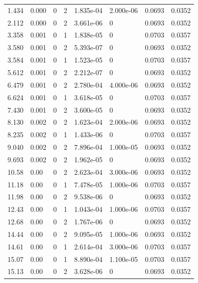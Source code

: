 \documentclass[preview]{standalone}
\begin{document}
{{\begin{tabular}{L{1.2cm}C{1.2cm} C{0.3cm}C{0.5cm} C{1.4cm}C{1.4cm} C{1.4cm}C{1.4cm}}
  1.434  &  0.000  & 0     &  2 &  1.835e-04  & 2.000e-06  & 0.0693 &  0.0352   \\ 
  2.112  &  0.000  & 0     &  2 &  3.661e-06  & 0  & 0.0693 &  0.0352   \\ 
  3.358  &  0.001  & 0     &  1 &  1.838e-05  & 0  & 0.0703 &  0.0357   \\ 
  3.580  &  0.001  & 0     &  2 &  5.393e-07  & 0  & 0.0693 &  0.0352   \\ 
  3.584  &  0.001  & 0     &  1 &  1.523e-05  & 0  & 0.0703 &  0.0357   \\ 
  5.612  &  0.001  & 0     &  2 &  2.212e-07  & 0  & 0.0693 &  0.0352   \\ 
  6.479  &  0.001  & 0     &  2 &  2.780e-04  & 4.000e-06  & 0.0693 &  0.0352   \\ 
  6.624  &  0.001  & 0     &  1 &  3.618e-05  & 0  & 0.0703 &  0.0357   \\ 
  7.430  &  0.001  & 0     &  2 &  3.600e-05  & 0  & 0.0693 &  0.0352   \\ 
  8.130  &  0.002  & 0     &  2 &  1.623e-04  & 2.000e-06  & 0.0693 &  0.0352   \\ 
  8.235  &  0.002  & 0     &  1 &  1.433e-06  & 0  & 0.0703 &  0.0357   \\ 
  9.040  &  0.002  & 0     &  2 &  7.896e-04  & 1.000e-05  & 0.0693 &  0.0352   \\ 
  9.693  &  0.002  & 0     &  2 &  1.962e-05  & 0  & 0.0693 &  0.0352   \\ 
  10.58  &  0.00  & 0     &  2 &  2.623e-04  & 3.000e-06  & 0.0693 &  0.0352   \\ 
  11.18  &  0.00  & 0     &  1 &  7.478e-05  & 1.000e-06  & 0.0703 &  0.0357   \\ 
  11.98  &  0.00  & 0     &  2 &  9.538e-06  & 0  & 0.0693 &  0.0352   \\ 
  12.43  &  0.00  & 0     &  1 &  1.043e-04  & 1.000e-06  & 0.0703 &  0.0357   \\ 
  12.68  &  0.00  & 0     &  2 &  1.767e-06  & 0  & 0.0693 &  0.0352   \\ 
  14.44  &  0.00  & 0     &  2 &  9.095e-05  & 1.000e-06  & 0.0693 &  0.0352   \\ 
  14.61  &  0.00  & 0     &  1 &  2.614e-04  & 3.000e-06  & 0.0703 &  0.0357   \\ 
  15.07  &  0.00  & 0     &  1 &  8.890e-04  & 1.100e-05  & 0.0703 &  0.0357   \\ 
  15.13  &  0.00  & 0     &  2 &  3.628e-06  & 0  & 0.0693 &  0.0352   \\ 

\end{tabular}}}
\end{document}
